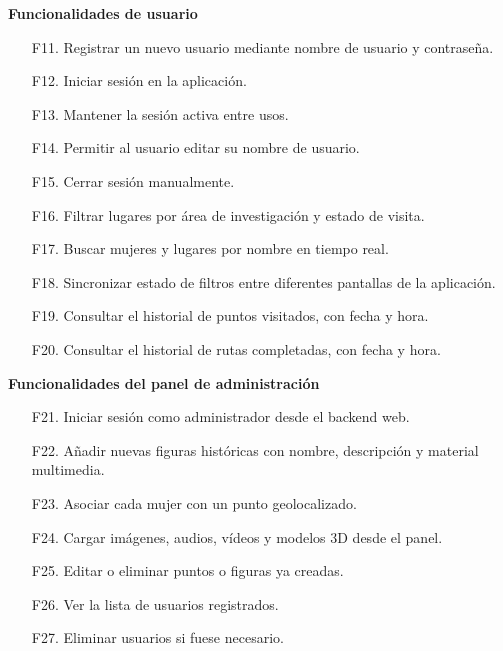 \vspace{0.3cm}

\textbf{\textsf{\large Funcionalidades de usuario}}

\vspace{0.3cm}

\begin{itemize}
    \item[F11.] Registrar un nuevo usuario mediante nombre de usuario y contraseña.
    \item[F12.] Iniciar sesión en la aplicación.
    \item[F13.] Mantener la sesión activa entre usos.
    \item[F14.] Permitir al usuario editar su nombre de usuario.
    \item[F15.] Cerrar sesión manualmente.
    \item[F16.] Filtrar lugares por área de investigación y estado de visita.
    \item[F17.] Buscar mujeres y lugares por nombre en tiempo real.
    \item[F18.] Sincronizar estado de filtros entre diferentes pantallas de la aplicación.
    \item[F19.] Consultar el historial de puntos visitados, con fecha y hora.
    \item[F20.] Consultar el historial de rutas completadas, con fecha y hora.
\end{itemize}

\vspace{0.3cm}

\textbf{\textsf{\large Funcionalidades del panel de administración}}

\vspace{0.3cm}

\begin{itemize}
    \item[F21.] Iniciar sesión como administrador desde el backend web.
    \item[F22.] Añadir nuevas figuras históricas con nombre, descripción y material multimedia.
    \item[F23.] Asociar cada mujer con un punto geolocalizado.
    \item[F24.] Cargar imágenes, audios, vídeos y modelos 3D desde el panel.
    \item[F25.] Editar o eliminar puntos o figuras ya creadas.
    \item[F26.] Ver la lista de usuarios registrados.
    \item[F27.] Eliminar usuarios si fuese necesario.
\end{itemize}

